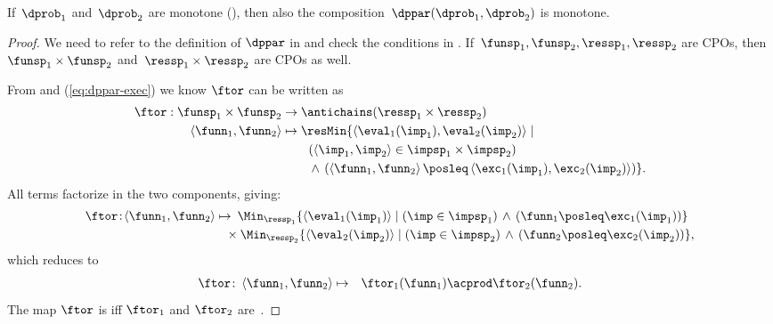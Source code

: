 \begin{proposition}
\label{pro:dppar-monotone}If~$\dprob_{1}$ and~$\dprob_{2}$ are
monotone (), then also the composition~$\dppar(\dprob_{1},\dprob_{2})$
is monotone.
\end{proposition}
\begin{proof}
We need to refer to the definition of $\dppar$ in 
and check the conditions in . If~$\funsp_{1},\funsp_{2},\ressp_{1},\ressp_{2}$
are CPOs, then~$\funsp_{1}\times\funsp_{2}$ and~$\ressp_{1}\times\ressp_{2}$
are CPOs as well.

From  and (\ref{eq:dppar-exec}) we know $\ftor$ can
be written as
\begin{align*}
\ftor:\funsp_{1}\times\funsp_{2} & \rightarrow\antichains(\ressp_{1}\times\ressp_{2})\\
\left\langle \funn_{1},\funn_{2}\right\rangle  & \mapsto\resMin\{\left\langle \eval_{1}(\imp_{1}),\eval_{2}(\imp_{2})\right\rangle \mid\\
 & \qquad\left(\left\langle \imp_{1},\imp_{2}\right\rangle \in\impsp_{1}\times\impsp_{2}\right)\\
 & \qquad\,\wedge\,\left(\left\langle \funn_{1},\funn_{2}\right\rangle \posleq\left\langle \exc_{1}(\imp_{1}),\exc_{2}(\imp_{2})\right\rangle \right)\}.
\end{align*}
All terms factorize in the two components, giving:{\small{}
\begin{align*}
\ftor\!:\!\left\langle \funn_{1},\funn_{2}\right\rangle \mapsto & \!\!\!\quad\Min_{\ressp_{1}}\{\left\langle \eval_{1}(\imp_{1})\right\rangle \mid\left(\imp\in\impsp_{1}\right)\,\wedge\,\left(\funn_{1}\posleq\exc_{1}(\imp_{1})\right)\}\\
 & \!\!\!\times\Min_{\ressp_{2}}\{\left\langle \eval_{2}(\imp_{2})\right\rangle \mid\left(\imp\in\impsp_{2}\right)\,\wedge\,\left(\funn_{2}\posleq\exc_{2}(\imp_{2})\right)\},
\end{align*}
}which reduces to 
\begin{eqnarray}
\ftor\colon\left\langle \funn_{1},\funn_{2}\right\rangle  & \mapsto & \ftor_{1}(\funn_{1})\acprod\ftor_{2}(\funn_{2}).\label{eq:isproduct}
\end{eqnarray}
The map $\ftor$ is \scottcontinuous iff $\ftor_{1}$ and $\ftor_{2}$
are~\cite[Lemma II.2.8]{gierz03continuous}.
\end{proof}

